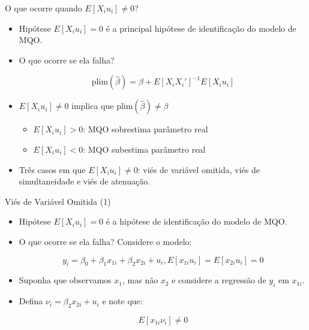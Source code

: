 \documentclass[10pt,slides,xcolor=pdftex,dvipsnames,table]{beamer}
\begin{document}
\begin{frame}{O que ocorre quando $E[X_i u_i] \neq 0$?}

\begin{itemize}\itemsep1.2em

    \item Hipótese $E [X_i u_i] = 0$ é a principal hipótese de identificação do modelo de MQO.  
    
    \item O que ocorre se ela falha? 
    
    $$ \text{plim} (\widehat{\beta}) = \beta + E [ X_i X_i']^{-1} E[X_i u_i] $$
    
    \item $E[X_i u_i] \neq 0$ implica que $\text{plim} (\widehat{\beta}) \neq \beta$
    \begin{itemize}
    \item $E[X_i u_i] > 0$: MQO sobrestima parâmetro real
    \item $E[X_i u_i] < 0$: MQO subestima parâmetro real
    \end{itemize}
    
	\item Três casos em que $E[X_i u_i] \neq 0$: viés de variável omitida, viés de simultaneidade e viés de atenuação.       
        
\end{itemize}

\end{frame}


\begin{frame}{Viés de Variável Omitida (1)}

\begin{itemize}\itemsep1.2em

    \item Hipótese $E [X_i u_i] = 0$ é a hipótese de identificação do modelo de MQO.  
    
    \item O que ocorre se ela falha? Considere o modelo:
    
    $$ y_i = \beta_0 + \beta_1 x_{1i} + \beta_2 x_{2i} + u_i, E[x_{1i} u_i]= E [x_{2i} u_i ] =0 $$

	\item Suponha que observamos $x_1$, mas não $x_2$ e considere a regressão de $y_i$ em $x_{1i}$. 
	
	\item Defina $\nu_i = \beta_2 x_{2i} + u_i$ e note que:
	
	$$ E [ x_{1i} \nu_i ] \neq 0 $$
        
\end{itemize}

\end{frame}
\end{document}
